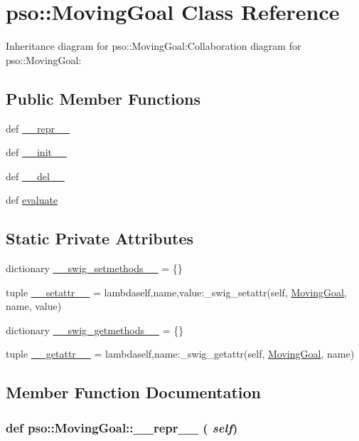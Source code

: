 \hypertarget{classpso_1_1MovingGoal}{
\section{pso::MovingGoal Class Reference}
\label{classpso_1_1MovingGoal}
}
Inheritance diagram for pso::MovingGoal:Collaboration diagram for pso::MovingGoal:\subsection*{Public Member Functions}
\begin{CompactItemize}
\item 
def \hyperlink{classpso_1_1MovingGoal_9a7bc1af4d07be74f83fda41d598ef9b}{\_\-\_\-repr\_\-\_\-}
\item 
def \hyperlink{classpso_1_1MovingGoal_cc887e0a1449493e7497703a3c6633f3}{\_\-\_\-init\_\-\_\-}
\item 
def \hyperlink{classpso_1_1MovingGoal_ccd203604cd67870527b7b16d0be7564}{\_\-\_\-del\_\-\_\-}
\item 
def \hyperlink{classpso_1_1MovingGoal_16ffa8c492ff6f56ed8fcbf20f168bdd}{evaluate}
\end{CompactItemize}
\subsection*{Static Private Attributes}
\begin{CompactItemize}
\item 
dictionary \hyperlink{classpso_1_1MovingGoal_ec7da72a4fcf6a13f9f700b4dcf02b34}{\_\-\_\-swig\_\-setmethods\_\-\_\-} = \{\}
\item 
tuple \hyperlink{classpso_1_1MovingGoal_bfa092e032ac4ccf2c8d070ec1e33dab}{\_\-\_\-setattr\_\-\_\-} = lambdaself,name,value:\_\-swig\_\-setattr(self, \hyperlink{classpso_1_1MovingGoal}{MovingGoal}, name, value)
\item 
dictionary \hyperlink{classpso_1_1MovingGoal_172aea1916c9d8526a126fde97abd8d3}{\_\-\_\-swig\_\-getmethods\_\-\_\-} = \{\}
\item 
tuple \hyperlink{classpso_1_1MovingGoal_6346e192c789f63d5942d57d9ce6f955}{\_\-\_\-getattr\_\-\_\-} = lambdaself,name:\_\-swig\_\-getattr(self, \hyperlink{classpso_1_1MovingGoal}{MovingGoal}, name)
\end{CompactItemize}


\subsection{Member Function Documentation}
\hypertarget{classpso_1_1MovingGoal_9a7bc1af4d07be74f83fda41d598ef9b}{
\subsubsection{\setlength{\rightskip}{0pt plus 5cm}def pso::MovingGoal::\_\-\_\-repr\_\-\_\- ( {\em self})}}
\label{classpso_1_1MovingGoal_9a7bc1af4d07be74f83fda41d598ef9b}




